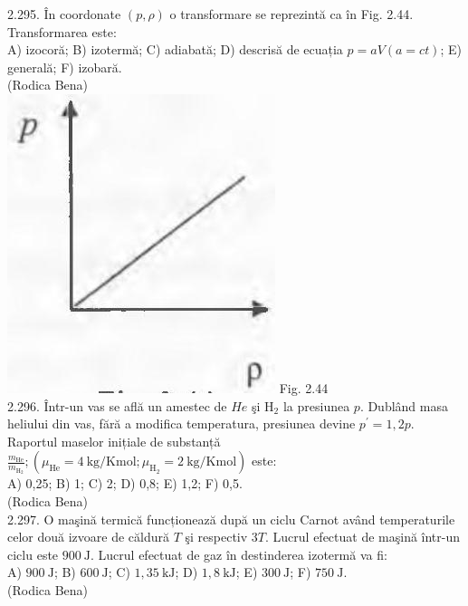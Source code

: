 \documentclass[10pt]{article}
\begin{document}
2.295. În coordonate $(p, \rho)$ o transformare se reprezintă ca în Fig. 2.44. Transformarea este:\\ A) izocoră; B) izotermă; C) adiabată; D) descrisă de ecuația $p=a V(a=c t)$; E) generală; F) izobară.\\ (Rodica Bena)\\ \includegraphics[max width=\textwidth, center]{2025_07_01_5b3ff9fa0d508c8e9f17g-139} Fig. 2.44\\

2.296. Într-un vas se află un amestec de $He$ şi $\mathrm{H}_{2}$ la presiunea $p$. Dublând masa heliului din vas, fără a modifica temperatura, presiunea devine $p^{\prime}=1,2 p$. Raportul maselor inițiale de substanță $\frac{m_{\mathrm{He}}}{m_{\mathrm{H}_{2}}} ;\left(\mu_{\mathrm{He}}=4 \mathrm{~kg} / \mathrm{Kmol} ; \mu_{\mathrm{H}_{2}}=2 \mathrm{~kg} / \mathrm{Kmol}\right)$ este:\\ A) 0,25; B) 1; C) 2; D) 0,8; E) 1,2; F) 0,5.\\ (Rodica Bena)\\

2.297. O maşină termică funcționează după un ciclu Carnot având temperaturile celor două izvoare de căldură $T$ şi respectiv $3 T$. Lucrul efectuat de maşină într-un ciclu este $900 \mathrm{~J}$. Lucrul efectuat de gaz în destinderea izotermă va fi:\\ A) $900 \mathrm{~J}$; B) $600 \mathrm{~J}$; C) $1,35 \mathrm{~kJ}$; D) $1,8 \mathrm{~kJ}$; E) $300 \mathrm{~J}$; F) $750 \mathrm{~J}$.\\ (Rodica Bena)\\
\end{document}
